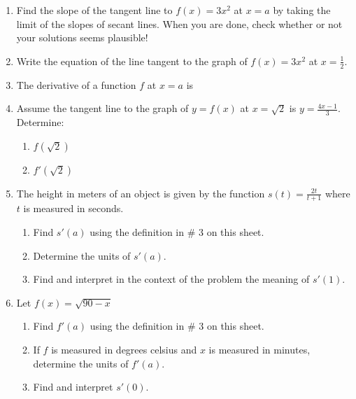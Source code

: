 \documentclass[11pt,fleqn]{article}
\begin{document}
\setlength{\parindent}{0cm}
\renewcommand{\headrulewidth}{0pt}
\newcommand{\blank}[1]{\rule{#1}{0.75pt}}
\renewcommand{\d}{\displaystyle}
\vspace*{-0.9in}
\begin{center}
  \Large {}
\end{center}
\small
\begin{enumerate}
\item Find the slope of the tangent line to $f(x)=3x^2$ at $x=a$ by taking the limit of the slopes of secant lines. When you are done, check whether or not your solutions seems plausible!\\

\vfill

\item Write the equation of the line tangent to the graph of $f(x)=3x^2$ at $x=\frac{1}{2}.$\\
\vfill

\item The derivative of a function $f$ at $x=a$ is

\vspace{.5in}


\item Assume the tangent line to the graph of $y=f(x)$ at $x=\sqrt{2}$ is $y=\frac{4x-1}{3}.$ Determine:
	\begin{enumerate}
	\item $f(\sqrt{2})$\\
	\vspace{1in}
	\item $f'(\sqrt{2})$\\
	\vspace{.5in}
	\end{enumerate}

\newpage
\item The height in meters of an object is given by the function $s(t)=\frac{2t}{t+1}$ where $t$ is measured in seconds. 
	\begin{enumerate}
	\item Find $s'(a)$ using the definition in \# 3 on this sheet. 
	\item Determine the units of $s'(a).$
	\item Find and interpret in the context of the problem the meaning of $s'(1).$
	\end{enumerate}
	\vfill
\item Let $f(x)=\sqrt{90-x}$
	\begin{enumerate}
	\item Find $f'(a)$ using the definition in \# 3 on this sheet. 
	\item If $f$ is measured in degrees celsius and $x$ is measured in minutes, determine the units of $f'(a).$
	\item Find and interpret $s'(0).$
	\end{enumerate}
	\vfill
\end{enumerate}
 
\end{document}
